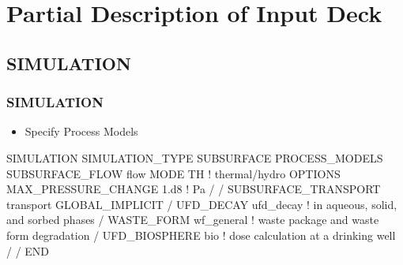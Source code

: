 \documentclass{beamer}
\newcommand\bluecomment[1]{{{\color{blue} #1}}}
\begin{document}

\section{Partial Description of Input Deck}

\subsection{SIMULATION}

\begin{frame}[fragile]\frametitle{SIMULATION}

\begin{itemize}
  \item Specify Process Models
\end{itemize}

\begin{semiverbatim}\small
SIMULATION
  SIMULATION_TYPE SUBSURFACE
  PROCESS_MODELS
    SUBSURFACE_FLOW flow
      MODE TH \bluecomment{! thermal/hydro}
      OPTIONS
        MAX_PRESSURE_CHANGE 1.d8 \bluecomment{! Pa}
      /   
    /   
    SUBSURFACE_TRANSPORT transport
      GLOBAL_IMPLICIT
    /
    UFD_DECAY ufd_decay \bluecomment{! in aqueous, solid, and sorbed phases}
    /
    WASTE_FORM wf_general \bluecomment{! waste package and waste form degradation}
    /
    UFD_BIOSPHERE bio \bluecomment{! dose calculation at a drinking well}
    /
  /
END
\end{semiverbatim}

\end{frame}
\end{document}
